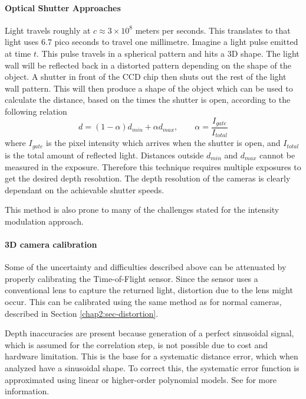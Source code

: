 \paragraph{Optical Shutter Approaches}
Light travels roughly at $c \approx 3 \times 10^8$ meters per seconds. This translates to
that light uses $6.7$ pico seconds to travel one millimetre. Imagine a light pulse emitted
at time $t$. This pulse travels in a spherical pattern and hits a 3D shape. The light wall
will be reflected back in a distorted pattern depending on the shape of the object.\cite{optical-shutter} 
A shutter in front of the CCD chip then
shuts out the rest of the light wall pattern. This will then produce a shape of the object
which can be used to calculate the distance, based on the times the shutter is open,
according to the following relation \cite{time-of-flight-comp-graphics}
\begin{equation}
    d = (1 - \alpha) d_{min} + \alpha d_{max}, \quad \quad \alpha =
    \frac{I_{gate}}{I_{total}}
\end{equation}
where $I_{gate}$ is the pixel intensity which arrives when the shutter is open, and
$I_{total}$ is the total amount of reflected light. Distances outside $d_{min}$ and
$d_{max}$ cannot be measured in the exposure. Therefore this technique requires multiple
exposures to get the desired depth resolution. The depth resolution of the cameras is 
clearly dependant on the achievable shutter speeds. 

This method is also prone to many of the challenges stated for the intensity modulation
approach.

\paragraph{3D camera calibration}
Some of the uncertainty and difficulties described above can be attenuated by properly
calibrating the Time-of-Flight sensor. Since the sensor uses a conventional lens to
capture the returned light, distortion due to the lens might occur. This can be calibrated
using the same method as for normal cameras, described in Section
\ref{chap2:sec-distortion}. 

Depth inaccuracies are present because generation of a perfect sinusoidal signal, which is
assumed for the correlation step, is not possible due to cost and hardware limitation. This
is the base for a systematic distance error, which when analyzed have a sinusoidal shape.
To correct this, the systematic error function is approximated using linear or higher-order 
polynomial models.  See \cite{tof-calibration} for more information.


